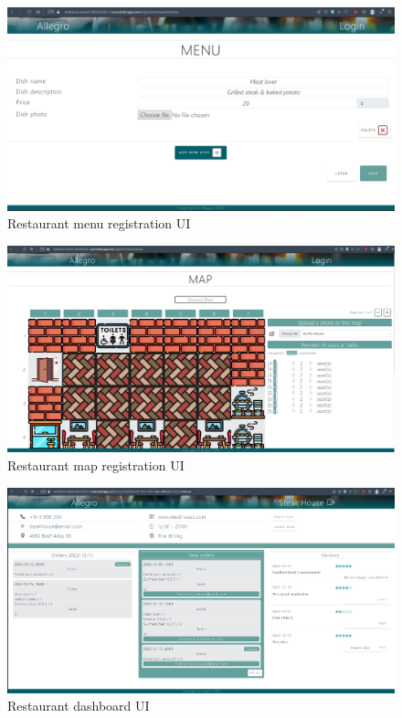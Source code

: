 \begin{figure}[ht]
	\centering
	\includegraphics[width=150mm, keepaspectratio]{figures/UI/10_RestaurantMenuEdit.png}
	\caption{Restaurant menu registration UI} 
	\label{fig:UI_10}
\end{figure}

\begin{figure}[ht]
	\centering
	\includegraphics[width=150mm, keepaspectratio]{figures/UI/11_RestaurantMapEdit.png}
	\caption{Restaurant map registration UI} 
	\label{fig:UI_11}
\end{figure}

\begin{figure}[ht]
	\centering
	\includegraphics[width=150mm, keepaspectratio]{figures/UI/12_Dashboard.png}
	\caption{Restaurant dashboard UI} 
	\label{fig:UI_12}
\end{figure}

